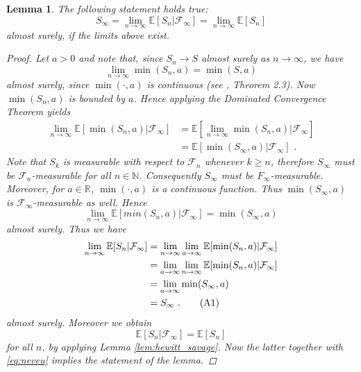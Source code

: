 \documentclass[phd]{UWMThesis}
\newcommand\numberthis{\addtocounter{equation}{1}\tag{\theequation}}
\newcommand{\E}{\mathbb{E}}
\newcommand{\R}{\mathbb{R}}
\newcommand{\F}{\mathcal{F}}
\newcommand{\mdot}{\textrm{ .}}
\renewcommand{\.}{\textrm{ .}}
\newtheorem{lemma}[thm]{Lemma}
\theoremstyle{definition}
\numberwithin{thm}{chapter}
\begin{document}
\begin{lemma}
	The following statement holds true:
	$$S_\infty = \lim\limits_{n\to\infty} \E[S_n| \F_\infty] = \lim\limits_{n\to\infty}\E[S_n]$$
	almost surely, if the limits above exist.
	\label{lem:connector}
	
	\begin{proof}
		Let $a>0$ and note that, since $S_n\to S$ almost surely as $n\to\infty$, we have
		$$\lim\limits_{n\to\infty}\min(S_n, a) = \min(S,a)$$ 
		almost surely, since $\min(\cdot, a)$ is continuous (see \cite{van2000asymptotic}, Theorem 2.3). Now $\min(S_n,a)$ is bounded by $a$. Hence applying the Dominated Convergence Theorem yields
		\begin{align*}
		\lim\limits_{n\to\infty} \E[\min(S_n,a)|\F_\infty] &= \E[\lim\limits_{n\to\infty} \min(S_n,a)|\F_\infty] \nonumber\\
		&= \E[\min(S_\infty,a)|\F_\infty]\mdot
		\end{align*}
		Note that $S_k$ is measurable with respect to $\F_n$  whenever $k\geq n$, therefore $S_\infty$ must be $\F_n$-measurable for all $n\in\mathbb{N}$. Consequently $S_\infty$ must be $F_\infty$-measurable. Moreover, for $a\in\R$, $\min(\cdot,a)$ is a continuous function. Thus $\min(S_\infty,a)$ is $\F_\infty$-measurable as well. Hence
		$$\lim\limits_{n\to\infty}\E[min(S_n,a)|\F_\infty] = \min(S_\infty,a) $$
		almost surely. Thus we have
		\begin{align*}
		\lim\limits_{n\to\infty} \E[S_n|\F_\infty] &=  \lim\limits_{n\to\infty}\lim\limits_{a\to\infty}\E[\min(S_n,a)|\F_\infty]\\
		&= \lim\limits_{a\to\infty}\lim\limits_{n\to\infty}\E[\min(S_n,a)|\F_\infty]\\
		&= \lim\limits_{a\to\infty}\min(S_\infty,a)\\
		&= S_\infty\mdot \numberthis \label{eq:neveu}
		\end{align*}
		almost surely. Moreover we obtain
		$$\E[S_n| \F_\infty] = \E[S_n] $$
		for all $n$, by applying Lemma \ref{lem:hewitt_savage}. Now the latter together with \eqref{eq:neveu} implies the statement of the lemma.
	\end{proof}
\end{lemma}
%
%
%
%
%
	
	
\end{document}
